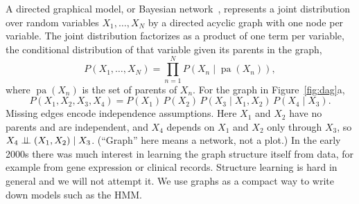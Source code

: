 A directed graphical model, or Bayesian network~\citep{pearl1988,koller2009}, represents a joint distribution over random variables $X_1,\dots,X_N$ by a directed acyclic graph with one node per variable. The joint distribution factorizes as a product of one term per variable, the conditional distribution of that variable given its parents in the graph,
\begin{equation}
  P(X_1,\dots,X_N) = \prod_{n=1}^N P\left(X_n \mid \operatorname{pa}(X_n)\right),
  \label{eq:dag_factorization}
\end{equation}
where $\operatorname{pa}(X_n)$ is the set of parents of $X_n$. For the graph in Figure~\ref{fig:dag}a,
\begin{equation}
  P(X_1,X_2,X_3,X_4) = P(X_1)\,P(X_2)\,P(X_3\mid X_1,X_2)\,P(X_4\mid X_3).
\end{equation}
Missing edges encode independence assumptions. Here $X_1$ and $X_2$ have no parents and are independent, and $X_4$ depends on $X_1$ and $X_2$ only through $X_3$, so $X_4\perp\!\!\!\perp(X_1,X_2)\mid X_3$. (``Graph'' here means a network, not a plot.) In the early 2000s there was much interest in learning the graph structure itself from data, for example from gene expression or clinical records. Structure learning is hard in general and we will not attempt it. We use graphs as a compact way to write down models such as the HMM.

